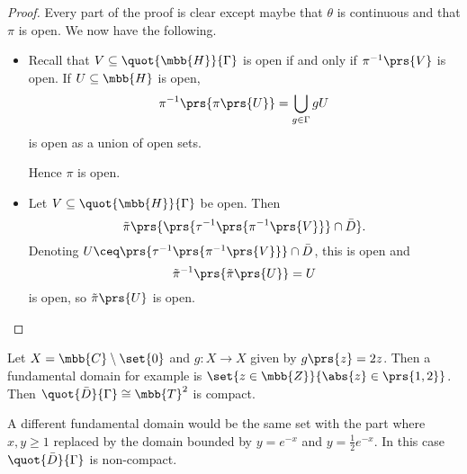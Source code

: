 \documentclass[10pt, twoside]{book}
\begin{document}
\begin{proof}
Every part of the proof is clear except maybe that $\theta$ is continuous and that $\pi$ is open.
We now have the following.
\begin{itemize}
\item Recall that $V \subseteq \quot{\mbb{H}}{\Gamma}$ is open if and only if $\pi^{-1}\prs{V}$ is open. If $U \subseteq \mbb{H}$ is open,
\[\pi^{-1}\prs{\pi\prs{U}} = \bigcup_{g \in \Gamma} gU\]
is open as a union of open sets.

Hence $\pi$ is open.

\item Let $V \subseteq \quot{\mbb{H}}{\Gamma}$ be open. Then
\[\tilde{\pi}\prs{\prs{\tau^{-1}\prs{\pi^{-1}\prs{V}}} \cap \bar{D}} \text{.}\]
Denoting $U \ceq \prs{\tau^{-1}\prs{\pi^{-1}\prs{V}}} \cap \bar{D}$, this is open and
\[\tilde{\pi}^{-1}\prs{\tilde{\pi}\prs{U}} = U\]
is open, so $\tilde{\pi}\prs{U}$ is open.
\end{itemize}
\end{proof}

\begin{example}
Let $X = \mbb{C} \setminus \set{0}$ and $g \colon X \to X$ given by $g\prs{z} = 2z$. Then a fundamental domain for example is $\set{z \in \mbb{Z}}{\abs{z} \in \prs{1,2}}$. Then $\quot{\bar{D}}{\Gamma} \cong \mbb{T}^2$ is compact.

A different fundamental domain would be the same set with the part where $x,y \geq 1$ replaced by the domain bounded by $y = e^{-x}$ and $y = \frac{1}{2} e^{-x}$. In this case $\quot{\bar{D}}{\Gamma}$ is non-compact.
\end{example}
\end{document}
